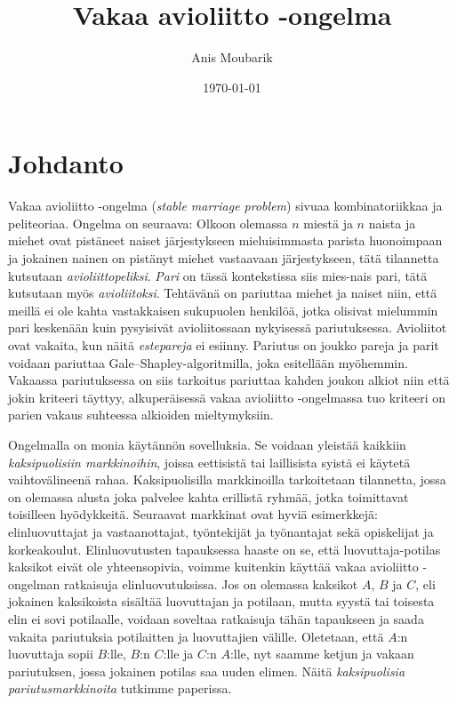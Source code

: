 \documentclass[finnish]{tktltiki2}
\title{Vakaa avioliitto -ongelma}
\author{Anis Moubarik}
\date{\today}
\theoremstyle{definition}
\theoremstyle{remark}
\begin{document}

\maketitle        %
\makeabstract
\tableofcontents  %
\newpage          %



\section{Johdanto}
Vakaa avioliitto -ongelma (\emph{stable marriage problem}) sivuaa kombinatoriikkaa ja peliteoriaa. Ongelma on seuraava: Olkoon olemassa $n$ miestä ja $n$ naista ja miehet ovat pistäneet naiset järjestykseen mieluisimmasta parista huonoimpaan ja jokainen nainen on pistänyt miehet vastaavaan järjestykseen, tätä tilannetta kutsutaan \emph{avioliittopeliksi}. \emph{Pari} on tässä kontekstissa siis mies-nais pari, tätä kutsutaan myös \emph{avioliitoksi}. Tehtävänä on pariuttaa miehet ja naiset niin, että meillä ei ole kahta vastakkaisen sukupuolen henkilöä, jotka olisivat mielummin pari keskenään kuin pysyisivät avioliitossaan nykyisessä pariutuksessa. Avioliitot ovat vakaita, kun näitä \emph{estepareja} ei esiinny. Pariutus on joukko pareja ja parit voidaan pariuttaa Gale--Shapley-algoritmilla, joka esitellään myöhemmin. Vakaassa pariutuksessa on siis tarkoitus pariuttaa kahden joukon alkiot niin että jokin kriteeri täyttyy, alkuperäisessä vakaa avioliitto -ongelmassa tuo kriteeri on parien vakaus suhteessa alkioiden mieltymyksiin.

Ongelmalla on monia käytännön sovelluksia. Se voidaan yleistää kaikkiin \emph{kaksipuolisiin markkinoihin}, joissa eettisistä tai laillisista syistä ei käytetä vaihtovälineenä rahaa. Kaksipuolisilla markkinoilla tarkoitetaan tilannetta, jossa on olemassa alusta joka palvelee kahta erillistä ryhmää, jotka toimittavat toisilleen hyödykkeitä. Seuraavat markkinat ovat hyviä esimerkkejä: elinluovuttajat ja vastaanottajat, työntekijät ja työnantajat sekä opiskelijat ja korkeakoulut. Elinluovutusten tapauksessa haaste on se, että luovuttaja-potilas kaksikot eivät ole yhteensopivia, voimme kuitenkin käyttää vakaa avioliitto -ongelman ratkaisuja elinluovutuksissa. Jos on olemassa kaksikot $A$, $B$ ja $C$, eli jokainen kaksikoista sisältää luovuttajan ja potilaan, mutta syystä tai toisesta elin ei sovi potilaalle, voidaan soveltaa ratkaisuja tähän tapaukseen ja saada vakaita pariutuksia potilaitten ja luovuttajien välille. Oletetaan, että $A$:n luovuttaja sopii $B$:lle, $B$:n $C$:lle ja $C$:n $A$:lle, nyt saamme ketjun ja vakaan pariutuksen, jossa jokainen potilas saa uuden elimen. Näitä \emph{kaksipuolisia pariutusmarkkinoita} tutkimme paperissa.
\end{document}
